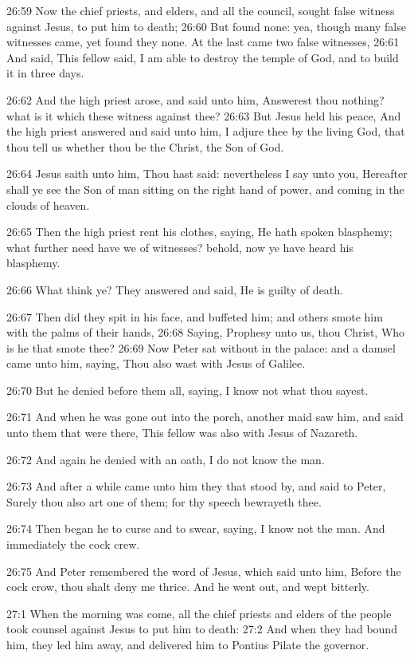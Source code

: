 26:59 Now the chief priests, and elders, and all the council, sought false witness against Jesus, to put him to death; 26:60 But found none: yea, though many false witnesses came, yet found they none. At the last came two false witnesses, 26:61 And said, This fellow said, I am able to destroy the temple of God, and to build it in three days.

26:62 And the high priest arose, and said unto him, Answerest thou nothing? what is it which these witness against thee?  26:63 But Jesus held his peace, And the high priest answered and said unto him, I adjure thee by the living God, that thou tell us whether thou be the Christ, the Son of God.

26:64 Jesus saith unto him, Thou hast said: nevertheless I say unto you, Hereafter shall ye see the Son of man sitting on the right hand of power, and coming in the clouds of heaven.

26:65 Then the high priest rent his clothes, saying, He hath spoken blasphemy; what further need have we of witnesses? behold, now ye have heard his blasphemy.

26:66 What think ye? They answered and said, He is guilty of death.

26:67 Then did they spit in his face, and buffeted him; and others smote him with the palms of their hands, 26:68 Saying, Prophesy unto us, thou Christ, Who is he that smote thee?  26:69 Now Peter sat without in the palace: and a damsel came unto him, saying, Thou also wast with Jesus of Galilee.

26:70 But he denied before them all, saying, I know not what thou sayest.

26:71 And when he was gone out into the porch, another maid saw him, and said unto them that were there, This fellow was also with Jesus of Nazareth.

26:72 And again he denied with an oath, I do not know the man.

26:73 And after a while came unto him they that stood by, and said to Peter, Surely thou also art one of them; for thy speech bewrayeth thee.

26:74 Then began he to curse and to swear, saying, I know not the man.  And immediately the cock crew.

26:75 And Peter remembered the word of Jesus, which said unto him, Before the cock crow, thou shalt deny me thrice. And he went out, and wept bitterly.

27:1 When the morning was come, all the chief priests and elders of the people took counsel against Jesus to put him to death: 27:2 And when they had bound him, they led him away, and delivered him to Pontius Pilate the governor.

